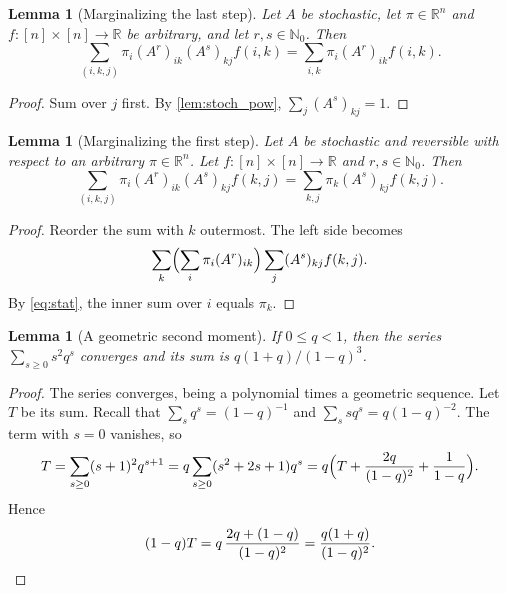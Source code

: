 \documentclass[11pt]{article}
\newtheorem{lemma}[theorem]{Lemma}
\theoremstyle{definition}
\theoremstyle{remark}
\newcommand{\R}{\mathbb{R}}
\newcommand{\Nz}{\mathbb{N}_0}
\begin{document}
\begin{lemma}[Marginalizing the last step]\label{lem:markov_subadd_left}
Let $A$ be stochastic, let $\pi\in\R^n$ and $f:[n]\times[n]\to\R$ be arbitrary, and let $r,s\in\Nz$. Then
\[
\sum_{(i,k,j)}\pi_i(A^r)_{ik}(A^s)_{kj}f(i,k)=\sum_{i,k}\pi_i(A^r)_{ik}f(i,k).
\]
\end{lemma}
\begin{proof}
Sum over $j$ first. By \cref{lem:stoch_pow}, $\sum_j(A^s)_{kj}=1$.
\end{proof}

\begin{lemma}[Marginalizing the first step]\label{lem:markov_subadd_right}
Let $A$ be stochastic and reversible with respect to an arbitrary $\pi\in\R^n$. Let $f:[n]\times[n]\to\R$ and $r,s\in\Nz$. Then
\[
\sum_{(i,k,j)}\pi_i(A^r)_{ik}(A^s)_{kj}f(k,j)=\sum_{k,j}\pi_k(A^s)_{kj}f(k,j).
\]
\end{lemma}
\begin{proof}
Reorder the sum with $k$ outermost. The left side becomes
\[
\sum_k\Bigl(\sum_i\pi_i(A^r)_{ik}\Bigr)\sum_j(A^s)_{kj}f(k,j).
\]
By \eqref{eq:stat}, the inner sum over $i$ equals $\pi_k$.
\end{proof}

\begin{lemma}[A geometric second moment]\label{lem:comp_geom_sq_sqsum}
If $0\le q<1$, then the series $\sum_{s\ge0}s^2q^s$ converges and its sum is $q(1+q)/(1-q)^3$.
\end{lemma}
\begin{proof}
The series converges, being a polynomial times a geometric sequence. Let $T$ be its sum. Recall that $\sum_s q^s=(1-q)^{-1}$ and $\sum_s sq^s=q(1-q)^{-2}$. The term with $s=0$ vanishes, so
\[
T=\sum_{s\ge0}(s+1)^2q^{s+1}=q\sum_{s\ge0}(s^2+2s+1)q^s=q\Bigl(T+\frac{2q}{(1-q)^2}+\frac1{1-q}\Bigr).
\]
Hence
\[
(1-q)T=q\,\frac{2q+(1-q)}{(1-q)^2}=\frac{q(1+q)}{(1-q)^2}. \qedhere
\]
\end{proof}
\end{document}
